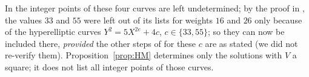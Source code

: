 In \cite[Remark~6.2]{HM} the integer points of these four curves are left undetermined; by the proof in \cite{HM}, the values $33$ and $55$ were left out of its lists for weights $16$ and $26$ only because of the hyperelliptic curves $Y^2=5X^{2e}+4c$, $c\in\{33,55\}$; so they can now be included there, \emph{provided} the other steps of \cite{HM} for these $c$ are as stated (we did not re-verify them). Proposition~\ref{prop:HM} determines only the solutions with $V$ a square; it does not list all integer points of those curves.
